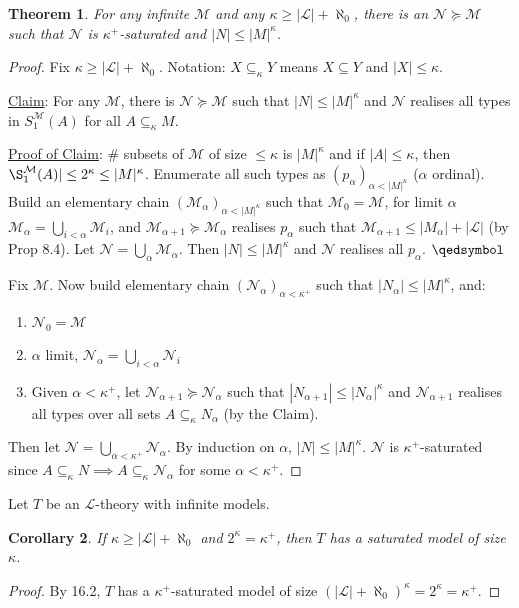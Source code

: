 \documentclass[]{article}
\theoremstyle{custhm}
\newtheorem{theorem}{Theorem}[section]
\theoremstyle{cusdef}
\theoremstyle{custhm}
\theoremstyle{custhm}
\newtheorem{cor}[theorem]{Corollary}
\theoremstyle{custhm}
\theoremstyle{ex}
\theoremstyle{custhm}
\theoremstyle{cusdef}
\theoremstyle{remark}
\theoremstyle{remark}
\theoremstyle{numremark}
\renewcommand{\L}{\mathcal{L}}
\newcommand{\M}{\mathcal{M}}
\newcommand{\N}{\mathcal{N}}
\renewcommand{\subset}{\subseteq}
\begin{document}
\begin{theorem}
	For any infinite $\M$ and any $\kappa \ge |\L| + \aleph_0$, there is an $\N\succeq\M$ such that $\N$ is $\kappa^+$-saturated and $|N| \le |M|^\kappa$.
\end{theorem}
\begin{proof}
	Fix $\kappa \ge |\L| + \aleph_0$. Notation: $X\subset_\kappa Y$ means $X\subset Y$ and $|X| \le \kappa$.

	\underline{Claim}: For any $\M$, there is $\N\succeq\M$ such that $|N|\le |M|^\kappa$ and $\N$ realises all types in $S_1^\M(A)$ for all $A\subset_\kappa M$.

	\underline{Proof of Claim}: \# subsets of $\M$ of size $\le \kappa$ is $|M|^\kappa$ and if $|A|\le \kappa$, then $\S_1^\M(A)| \le 2^\kappa\le |M|^\kappa$. Enumerate all such types as $(p_\alpha)_{\alpha < |M|^\kappa}$ ($\alpha$ ordinal). Build an elementary chain $(\M_\alpha)_{\alpha < |M|^\kappa}$ such that $\M_0 = \M$, for limit $\alpha$ $\M_\alpha = \bigcup_{i<\alpha}\M_i$, and $\M_{\alpha+1} \succeq \M_\alpha$ realises $p_\alpha$ such that $\M_{\alpha+1} \le |M_\alpha| + |\L|$ (by Prop 8.4). Let $\N = \bigcup_\alpha \M_\alpha$. Then $|N| \le |M|^\kappa$ and $\N$ realises all $p_\alpha$. $\qedsymbol$

	Fix $\M$. Now build elementary chain $(\N_\alpha)_{\alpha < \kappa^+}$ such that $|N_\alpha| \le |M|^\kappa$, and:
	\begin{enumerate}
		\item $\N_0 = \M$
		\item $\alpha$ limit, $\N_\alpha = \bigcup_{i<\alpha}\N_i$
		\item Given $\alpha < \kappa^+$, let $\N_{\alpha+1}\succeq \N_\alpha$ such that $|N_{\alpha+1}| \le |N_\alpha|^\kappa$ and $\N_{\alpha+1}$ realises all types over all sets $A\subset_\kappa N_{\alpha}$ (by the Claim).
	\end{enumerate}
	Then let $\N = \bigcup_{\alpha < \kappa^+}\N_\alpha$. By induction on $\alpha$, $|N|\le |M|^\kappa$. $\N$ is $\kappa^+$-saturated since $A\subset_\kappa N\implies A\subset_\kappa \N_\alpha$ for some $\alpha < \kappa^+$.
\end{proof}

Let $T$ be an $\L$-theory with infinite models.

\begin{cor}
	If $\kappa \ge |\L|+\aleph_0$ and $2^\kappa = \kappa^+$, then $T$ has a saturated model of size $\kappa$.
\end{cor}
\begin{proof}
	By 16.2, $T$ has a $\kappa^+$-saturated model of size $(|\L|+\aleph_0)^\kappa = 2^\kappa = \kappa^+$.
\end{proof}
\end{document}
